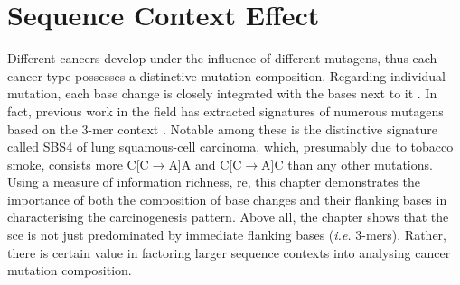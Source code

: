 \chapter{Sequence Context Effect}\label{sce}

Different cancers develop under the influence of different mutagens, thus each cancer type possesses a distinctive mutation composition. Regarding individual mutation, each base change is closely integrated with the bases next to it \citep{Zhu2017,Zhu2020,Vinson2012CGMethylation}. In fact, previous work in the field has extracted signatures of numerous mutagens based on the 3-mer context \citep[see \gls{kmer};][]{Alexandrov2020,Alexandrov2013}. Notable among these is the distinctive signature called SBS4 of lung squamous-cell carcinoma, which, presumably due to tobacco smoke, consists more C[C$\rightarrow$A]A and C[C$\rightarrow$A]C than any other mutations. Using a measure of information richness, \gls{re}, this chapter demonstrates the importance of both the composition of base changes and their flanking bases in characterising the carcinogenesis pattern. Above all, the chapter shows that the \gls{sce} is not just predominated by immediate flanking bases (\textit{i.e.} 3-mers). Rather, there is certain value in factoring larger sequence contexts into analysing cancer mutation composition.

